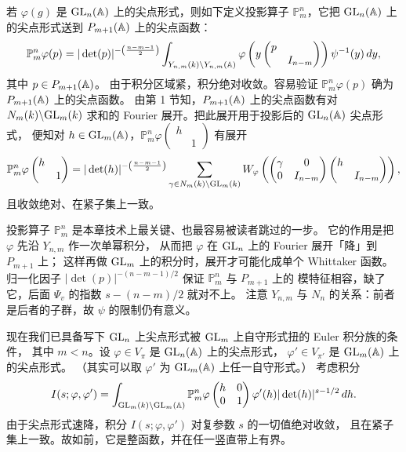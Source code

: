 若 $\varphi(g)$ 是 $\mathrm{GL}_n(\mathbb{A})$ 上的尖点形式，则如下定义投影算子
$\mathbb{P}^n_m$，它把 $\mathrm{GL}_n(\mathbb{A})$ 上的尖点形式送到 $P_{m+1}(\mathbb{A})$ 上的尖点函数：
\[
\mathbb{P}^n_m\varphi(p)=|\det(p)|^{-\left(\frac{n-m-1}{2}\right)}
\int_{Y_{n,m}(k)\backslash Y_{n,m}(\mathbb{A})}
\varphi\left(y\begin{pmatrix}p&\\&I_{n-m}\end{pmatrix}\right)\psi^{-1}(y)\,dy,
\]
其中 $p\in P_{m+1}(\mathbb{A})$。
由于积分区域紧，积分绝对收敛。容易验证 $\mathbb{P}^n_m\varphi(p)$ 确为
$P_{m+1}(\mathbb{A})$ 上的尖点函数。
由第 1 节知，$P_{m+1}(\mathbb{A})$ 上的尖点函数有对 $N_m(k)\backslash\mathrm{GL}_m(k)$ 求和的
Fourier 展开。把此展开用于投影后的 $\mathrm{GL}_n(\mathbb{A})$ 尖点形式，
便知对 $h\in\mathrm{GL}_m(\mathbb{A})$，$\mathbb{P}^n_m\varphi\begin{pmatrix}h&\\&1\end{pmatrix}$ 有展开
\[
\mathbb{P}^n_m\varphi\begin{pmatrix}h&\\&1\end{pmatrix}
=|\det(h)|^{-\left(\frac{n-m-1}{2}\right)}
\sum_{\gamma\in N_m(k)\backslash\mathrm{GL}_m(k)}
W_\varphi\left(\begin{pmatrix}\gamma&0\\0&I_{n-m}\end{pmatrix}
\begin{pmatrix}h&\\&I_{n-m}\end{pmatrix}\right),
\]
且收敛绝对、在紧子集上一致。
\begin{annote}
投影算子 $\mathbb{P}^n_m$ 是本章技术上最关键、也最容易被读者跳过的一步。
它的作用是把 $\varphi$ 先沿 $Y_{n,m}$ 作一次单幂积分，
从而把 $\varphi$ 在 $\mathrm{GL}_n$ 上的 Fourier 展开「降」到 $P_{m+1}$ 上；
这样再做 $\mathrm{GL}_m$ 上的积分时，展开才可能化成单个 Whittaker 函数。
归一化因子 $|\det(p)|^{-(n-m-1)/2}$ 保证 $\mathbb{P}^n_m$ 与 $P_{m+1}$ 上的
模特征相容，缺了它，后面 $\Psi_v$ 的指数 $s-(n-m)/2$ 就对不上。
注意 $Y_{n,m}$ 与 $N_n$ 的关系：前者是后者的子群，故 $\psi$ 的限制仍有意义。
\par{}
\end{annote}

现在我们已具备写下 $\mathrm{GL}_n$ 上尖点形式被 $\mathrm{GL}_m$ 上自守形式扭的 Euler 积分族的条件，
其中 $m<n$。设 $\varphi\in V_\pi$ 是 $\mathrm{GL}_n(\mathbb{A})$ 上的尖点形式，
$\varphi'\in V_{\pi'}$ 是 $\mathrm{GL}_m(\mathbb{A})$ 上的尖点形式。
（其实可以取 $\varphi'$ 为 $\mathrm{GL}_m(\mathbb{A})$ 上任一自守形式。）
考虑积分
\[
I(s;\varphi,\varphi')=\int_{\mathrm{GL}_m(k)\backslash\mathrm{GL}_m(\mathbb{A})}
\mathbb{P}^n_m\varphi\begin{pmatrix}h&0\\0&1\end{pmatrix}
\varphi'(h)|\det(h)|^{s-1/2}\,dh.
\]
由于尖点形式速降，积分 $I(s;\varphi,\varphi')$ 对复参数 $s$ 的一切值绝对收敛，
且在紧子集上一致。故如前，它是整函数，并在任一竖直带上有界。

